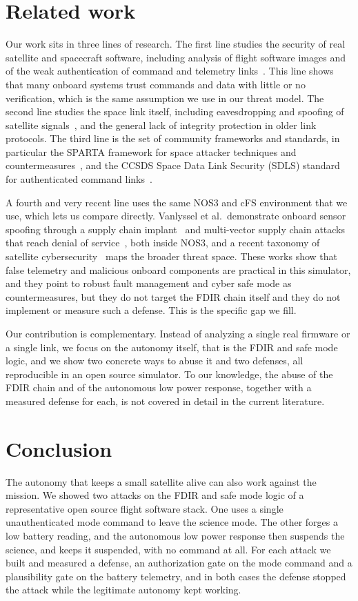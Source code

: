 \documentclass[conference,letterpaper,10pt]{IEEEtran}
\begin{document}
\section{Related work}
Our work sits in three lines of research. The first line studies the security of real satellite and spacecraft software, including analysis of flight software images and of the weak authentication of command and telemetry links~\cite{spaceodyssey}. This line shows that many onboard systems trust commands and data with little or no verification, which is the same assumption we use in our threat model. The second line studies the space link itself, including eavesdropping and spoofing of satellite signals~\cite{vsat}, and the general lack of integrity protection in older link protocols. The third line is the set of community frameworks and standards, in particular the SPARTA framework for space attacker techniques and countermeasures~\cite{sparta}, and the CCSDS Space Data Link Security (SDLS) standard for authenticated command links~\cite{sdls}.

A fourth and very recent line uses the same NOS3 and cFS environment that we use, which lets us compare directly. Vanlyssel et al.\ demonstrate onboard sensor spoofing through a supply chain implant~\cite{silentsub} and multi-vector supply chain attacks that reach denial of service~\cite{spychain}, both inside NOS3, and a recent taxonomy of satellite cybersecurity~\cite{satsok} maps the broader threat space. These works show that false telemetry and malicious onboard components are practical in this simulator, and they point to robust fault management and cyber safe mode as countermeasures, but they do not target the FDIR chain itself and they do not implement or measure such a defense. This is the specific gap we fill.

Our contribution is complementary. Instead of analyzing a single real firmware or a single link, we focus on the autonomy itself, that is the FDIR and safe mode logic, and we show two concrete ways to abuse it and two defenses, all reproducible in an open source simulator. To our knowledge, the abuse of the FDIR chain and of the autonomous low power response, together with a measured defense for each, is not covered in detail in the current literature.

\section{Conclusion}
The autonomy that keeps a small satellite alive can also work against the mission. We showed two attacks on the FDIR and safe mode logic of a representative open source flight software stack. One uses a single unauthenticated mode command to leave the science mode. The other forges a low battery reading, and the autonomous low power response then suspends the science, and keeps it suspended, with no command at all. For each attack we built and measured a defense, an authorization gate on the mode command and a plausibility gate on the battery telemetry, and in both cases the defense stopped the attack while the legitimate autonomy kept working.
\end{document}
